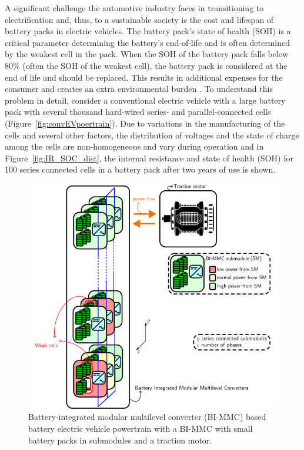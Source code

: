 \documentclass{article}
\begin{document}
A significant challenge the automotive industry faces in transitioning to electrification and, thus, to a sustainable society is the cost and lifespan of battery packs in electric vehicles. The battery pack's state of health (SOH) is a critical parameter determining the battery's end-of-life and is often determined by the weakest cell in the pack. When the SOH of the battery pack falls below 80\% (often the SOH of the weakest cell), the battery pack is considered at the end of life and should be replaced. This results in additional expenses for the consumer and creates an extra environmental burden \cite{canals2022electric}. To understand this problem in detail, consider a conventional electric vehicle with a large battery pack with several thousand hard-wired series- and parallel-connected cells (Figure~\ref{fig:convEVpoertrain}). Due to variations in the manufacturing of the cells and several other factors, the distribution of voltages and the state of charge among the cells are non-homogeneous and vary during operation \cite{schuster2015lithium} and in Figure~\ref{fig:IR_SOC_dist}, the internal resistance and state of health (SOH) for 100 series connected cells in a battery pack after two years of use is shown.
\begin{figure}[!b]
    \centering
    \includegraphics[width=\textwidth]{Figures/BI_MMC_powertrain.png}
    \caption{Battery-integrated modular multilevel converter (BI-MMC) based battery electric vehicle powertrain with a BI-MMC with small battery packs in submodules and a traction motor.}
    \label{fig:BIMMCpoertrain}
\end{figure}
\end{document}
